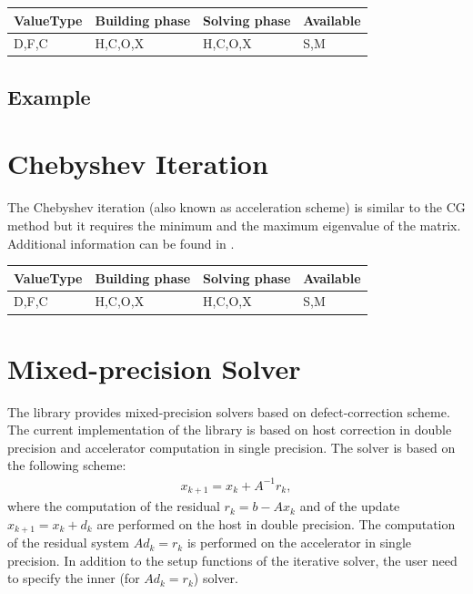 \begin{table}[H]
\begin{tabular}{l|l|l|l}
\multicolumn{1}{c|}{ValueType} & Building phase & Solving phase & Available \\ \hline
D,F,C                          & H,C,O,X        & H,C,O,X       & S,M      
\end{tabular}
\end{table}



\subsection*{Example}



\section{Chebyshev Iteration}

The Chebyshev iteration (also known as acceleration scheme) is similar to the CG method but it requires the minimum and the maximum eigenvalue of the matrix. Additional information can be found in \cite{templates}.

\begin{table}[H]
\begin{tabular}{l|l|l|l}
\multicolumn{1}{c|}{ValueType} & Building phase & Solving phase & Available \\ \hline
D,F,C                          & H,C,O,X        & H,C,O,X       & S,M      
\end{tabular}
\end{table}



\section{Mixed-precision Solver}

The library provides mixed-precision solvers based on defect-correction scheme. The current implementation of the library is based on host correction in double precision and accelerator computation in single precision. The solver is based on the following scheme:
%
\begin{eqnarray}
 x_{k+1}=x_{k} + A^{-1}r_{k},
\end{eqnarray}
%
where the computation of the residual $r_{k}=b-A x_{k}$ and of the update $ x_{k+1}=x_{k} + d_{k}$ are performed on the host in double precision. The computation of the residual system $Ad_k=r_k$ is performed on the accelerator in single precision. In addition to the setup functions of the iterative solver, the user need to specify the inner (for $Ad_k=r_k$) solver.

